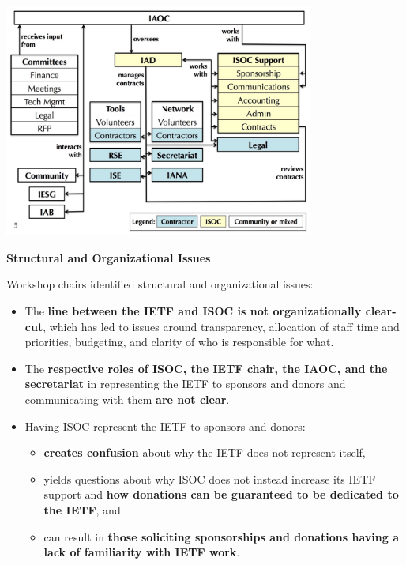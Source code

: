 \documentclass[helvetica]{seminar}
\newcommand{\heading}[1]{%
  \begin{center} 
    \large\bf 
    #1 
  \end{center} 
  \vspace{.4 in}}
\begin{document}
\begin{slide}

\includegraphics[width=4.0in]{IASA-org-chart}

\end{slide}

\begin{slide}
\heading{Structural and Organizational Issues}

Workshop chairs identified structural and organizational issues:
{\footnotesize
\begin{itemize}
\item The \textbf{line between the IETF and ISOC is not
  organizationally clear-cut}, which has led to issues around
  transparency, allocation of staff time and priorities, budgeting,
  and clarity of who is responsible for what.
\item The \textbf{respective roles of ISOC, the IETF chair, the IAOC,
  and the secretariat} in representing the IETF to sponsors and donors
  and communicating with them \textbf{are not clear}.
\item Having ISOC represent the IETF to sponsors and donors:
  \begin{itemize}
  \item \textbf{creates confusion} about why the IETF does not
    represent itself,
  \item yields questions about why ISOC does not instead increase its
    IETF support and \textbf{how donations can be guaranteed to be
      dedicated to the IETF}, and
  \item can result in \textbf{those soliciting sponsorships and
    donations having a lack of familiarity with IETF work}.
  \end{itemize}
\end{itemize}
}

\end{slide}
\end{document}
